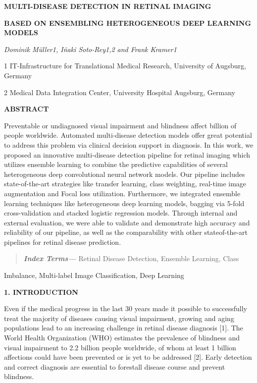 \documentclass[
]{article}
\author{}
\date{}
\begin{document}
\textbf{MULTI-DISEASE DETECTION IN RETINAL IMAGING}

\textbf{BASED ON ENSEMBLING HETEROGENEOUS DEEP LEARNING MODELS}

\emph{Dominik Müller1, Iñaki Soto-Rey1,2 and Frank Kramer1}

1 IT-Infrastructure for Translational Medical Research, University of
Augsburg, Germany

2 Medical Data Integration Center, University Hospital Augsburg, Germany

\textbf{ABSTRACT}

Preventable or undiagnosed visual impairment and blindness affect
billion of people worldwide. Automated multi-disease detection models
offer great potential to address this problem via clinical decision
support in diagnosis. In this work, we proposed an innovative
multi-disease detection pipeline for retinal imaging which utilizes
ensemble learning to combine the predictive capabilities of several
heterogeneous deep convolutional neural network models. Our pipeline
includes state-of-the-art strategies like transfer learning, class
weighting, real-time image augmentation and Focal loss utilization.
Furthermore, we integrated ensemble learning techniques like
heterogeneous deep learning models, bagging via 5-fold cross-validation
and stacked logistic regression models. Through internal and external
evaluation, we were able to validate and demonstrate high accuracy and
reliability of our pipeline, as well as the comparability with other
stateof-the-art pipelines for retinal disease prediction.

\begin{quote}
\emph{\textbf{Index Terms---}} Retinal Disease Detection, Ensemble
Learning, Class
\end{quote}

Imbalance, Multi-label Image Classification, Deep Learning

\textbf{1. INTRODUCTION}

Even if the medical progress in the last 30 years made it possible to
successfully treat the majority of diseases causing visual impairment,
growing and aging populations lead to an increasing challenge in retinal
disease diagnosis {[}1{]}. The World Health Organization (WHO) estimates
the prevalence of blindness and visual impairment to 2.2 billion people
worldwide, of whom at least 1 billion affections could have been
prevented or is yet to be addressed {[}2{]}. Early detection and correct
diagnosis are essential to forestall disease course and prevent
blindness.
\end{document}
